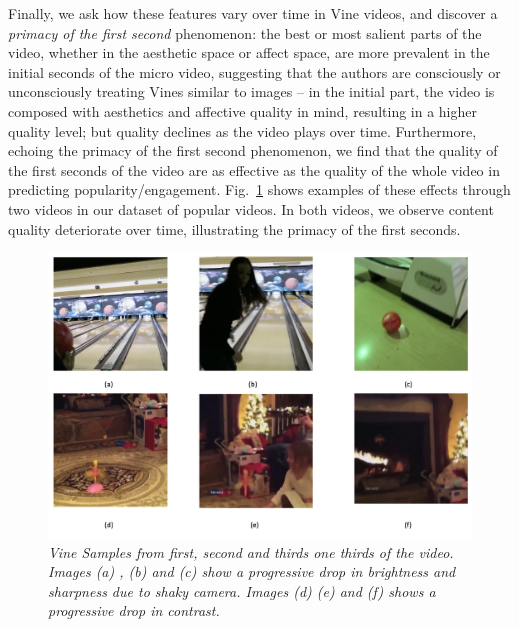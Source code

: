 Finally, we ask how these features vary over time in Vine videos, and discover a \emph{primacy of the first second} phenomenon: the best or most salient parts of the video, whether in the aesthetic space or affect space, are more prevalent in the initial seconds of the micro video, suggesting that the authors are consciously or unconsciously treating Vines similar to images -- in the initial part, the video is composed with aesthetics and affective quality in mind, resulting in a higher quality level; but quality declines as the video plays over time. Furthermore, echoing the primacy of the first second phenomenon, we find that the quality of the first seconds of the video are as effective as the quality of the whole video in predicting popularity/engagement. Fig.~\ref{fig:Vine_samples} shows examples of these effects through two videos in our dataset of popular videos. In both videos, we observe content quality deteriorate over time, illustrating the primacy of the first seconds. 
 
\begin{figure}[!tbh]
\centering
\includegraphics[width=\columnwidth]{figures/Vine_samples2}
\caption{\textsl{ Vine Samples from first, second and thirds one thirds of the video. Images (a) , (b) and (c) show a progressive drop in brightness and sharpness due to shaky camera. Images (d) (e) and (f) shows a progressive drop in contrast.}}
\label{fig:Vine_samples}
\end{figure}
%
%
%
%


